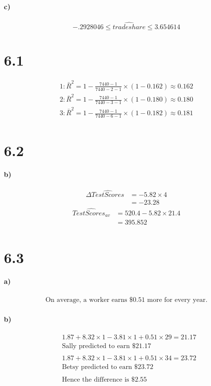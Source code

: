 \documentclass[letterpaper,12pt,titlepage,oneside,final]{book}
\begin{document}
\paragraph{c)}
\begin{align*}
-.2928046  \leq \widehat{ tradeshare} \leq 3.654614
\end{align*}

\section*{6.1}
\begin{align*}
1 : \bar{R}^2 = 1 - \frac{7440-1}{7440-2-1}\times \left(1-0.162\right) \approx 0.162\\
2 : \bar{R}^2 = 1 - \frac{7440-1}{7440-3-1}\times \left(1-0.180\right) \approx 0.180\\
3 : \bar{R}^2 = 1 - \frac{7440-1}{7440 -6-1}\times \left(1-0.182\right) \approx 0.181\\
\end{align*}

\section*{6.2}
\paragraph{b)}
\begin{align*}
\Delta\widehat{Test Scores} &= -5.82\times 4\\
&= -23.28
\end{align*}
\begin{align*}
\widehat{Test Scores_{av}} &= 520.4 - 5.82\times 21.4\\
&=395.852\\
\end{align*}

\section*{6.3}
\paragraph{a)}
\begin{align*}
\text{On average, a worker earns \$ 0.51 more for every year.}
\end{align*}
\paragraph{b)}
\begin{align*}
&1.87 +8.32 \times 1 - 3.81 \times 1 + 0.51 \times 29 = 21.17\\
&\text{Sally predicted to earn \$ 21.17}\\
\\
&1.87 +8.32 \times 1 - 3.81 \times 1 + 0.51 \times 34 = 23.72\\
&\text{Betsy predicted to earn \$ 23.72}\\
\\
&\text{Hence the difference is  \$ 2.55}\\
\end{align*}
\end{document}
